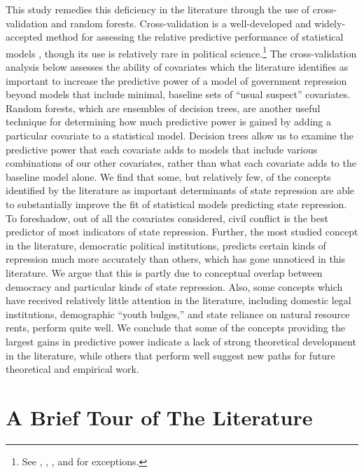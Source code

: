 \documentclass[12pt]{article}
\begin{document}
This study remedies this deficiency in the literature through the use of cross-validation and random forests. Cross-validation is a well-developed and widely-accepted method for assessing the relative predictive performance of statistical models \citep[See, e.g.,][]{Geisser1975, Efron1983, PicardCook1984, HastieTibshiraniFriedman2008}, though its use is relatively rare in political science.\footnote{See \citet{HoffWard2004}, \citet{WardHoff2007}, \citet{WardSiversonCao2007}, and \citet{Wardetal2010} for exceptions.} The cross-validation analysis below assesses the ability of covariates which the literature identifies as important to increase the predictive power of a model of government repression beyond models that include minimal, baseline sets of ``usual suspect'' covariates. 
Random forests, which are ensembles of decision trees, are another useful technique for determining how much predictive power is gained by adding a particular covariate to a statistical model. Decision trees allow us to examine the predictive power that each covariate adds to models that include various combinations of our other covariates, rather than what each covariate adds to the baseline model alone. We find that some, but relatively few, of the concepts identified by the literature as important determinants of state repression are able to substantially improve the fit of statistical models predicting state repression. To foreshadow, out of all the covariates considered, civil conflict is the best predictor of most indicators of state repression. Further, the most studied concept in the literature, democratic political institutions, predicts certain kinds of repression much more accurately than others, which has gone unnoticed in this literature. We argue that this is partly due to conceptual overlap between democracy and particular kinds of state repression. Also, some concepts which have received relatively little attention in the literature, including domestic legal institutions, demographic ``youth bulges,'' and state reliance on natural resource rents, perform quite well. We conclude that some of the concepts providing the largest gains in predictive power indicate a lack of strong theoretical development in the literature, while others that perform well suggest new paths for future theoretical and empirical work. 

\section{A Brief Tour of The Literature}
\end{document}
